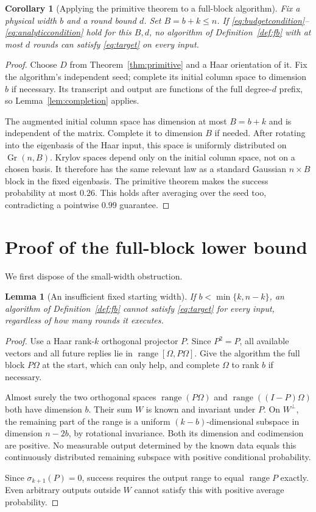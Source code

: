 \documentclass[11pt]{article}
\newtheorem{lemma}[theorem]{Lemma}
\newtheorem{corollary}[theorem]{Corollary}
\theoremstyle{definition}
\newcommand{\ran}{\operatorname{range}}
\newcommand{\Gr}{\operatorname{Gr}}
\begin{document}
\begin{corollary}[Applying the primitive theorem to a full-block algorithm]\label{cor:output}
Fix a physical width $b$ and a round bound $d$. Set $B=b+k\le n$. If \eqref{eq:budgetcondition}--\eqref{eq:analyticcondition} hold for this $B,d$, no algorithm of Definition~\ref{def:fb} with at most $d$ rounds can satisfy \eqref{eq:target} on every input.
\end{corollary}
\begin{proof}
Choose $D$ from Theorem~\ref{thm:primitive} and a Haar orientation of it. Fix the algorithm's independent seed; complete its initial column space to dimension $b$ if necessary. Its transcript and output are functions of the full degree-$d$ prefix, so Lemma~\ref{lem:completion} applies.

The augmented initial column space has dimension at most $B=b+k$ and is independent of the matrix. Complete it to dimension $B$ if needed. After rotating into the eigenbasis of the Haar input, this space is uniformly distributed on $\Gr(n,B)$. Krylov spaces depend only on the initial column space, not on a chosen basis. It therefore has the same relevant law as a standard Gaussian $n\times B$ block in the fixed eigenbasis. The primitive theorem makes the success probability at most $0.26$. This holds after averaging over the seed too, contradicting a pointwise $0.99$ guarantee.
\end{proof}

\section{Proof of the full-block lower bound}\label{sec:fblower}
We first dispose of the small-width obstruction.
\begin{lemma}[An insufficient fixed starting width]\label{lem:width}
If $b<\min\{k,n-k\}$, an algorithm of Definition~\ref{def:fb} cannot satisfy \eqref{eq:target} for every input, regardless of how many rounds it executes.
\end{lemma}
\begin{proof}
Use a Haar rank-$k$ orthogonal projector $P$. Since $P^2=P$, all available vectors and all future replies lie in $\ran[\Omega,P\Omega]$. Give the algorithm the full block $P\Omega$ at the start, which can only help, and complete $\Omega$ to rank $b$ if necessary.

Almost surely the two orthogonal spaces $\ran(P\Omega)$ and $\ran((I-P)\Omega)$ both have dimension $b$. Their sum $W$ is known and invariant under $P$. On $W^\perp$, the remaining part of the range is a uniform $(k-b)$-dimensional subspace in dimension $n-2b$, by rotational invariance. Both its dimension and codimension are positive. No measurable output determined by the known data equals this continuously distributed remaining subspace with positive conditional probability.

Since $\sigma_{k+1}(P)=0$, success requires the output range to equal $\ran P$ exactly. Even arbitrary outputs outside $W$ cannot satisfy this with positive average probability.
\end{proof}
\end{document}
